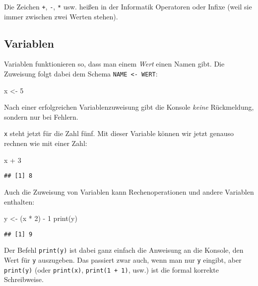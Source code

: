 \documentclass[11pt,german,a4paper]{article}
\newenvironment{Shaded}{\begin{snugshade}}{\end{snugshade}}
\newcommand{\DecValTok}[1]{\textcolor[rgb]{0.00,0.00,0.81}{#1}}
\newcommand{\FunctionTok}[1]{\textcolor[rgb]{0.00,0.00,0.00}{#1}}
\newcommand{\NormalTok}[1]{#1}
\newcommand{\OtherTok}[1]{\textcolor[rgb]{0.56,0.35,0.01}{#1}}
\newcommand{\SpecialCharTok}[1]{\textcolor[rgb]{0.00,0.00,0.00}{#1}}
\begin{document}
Die Zeichen \texttt{+}, \texttt{-}, \texttt{*} usw. heißen in der Informatik Operatoren oder Infixe (weil sie immer zwischen zwei Werten stehen).

\hypertarget{variablen}{%
\subsection{Variablen}\label{variablen}}

Variablen funktionieren so, dass man einem \emph{Wert} einen Namen gibt. Die Zuweisung folgt dabei dem Schema \texttt{NAME\ \textless{}-\ WERT}:

\begin{Shaded}
\begin{Highlighting}[]
\NormalTok{x }\OtherTok{\textless{}{-}} \DecValTok{5}
\end{Highlighting}
\end{Shaded}

Nach einer erfolgreichen Variablenzuweisung gibt die Konsole \emph{keine} Rückmeldung, sondern nur bei Fehlern.

\texttt{x} steht jetzt für die Zahl fünf. Mit dieser Variable können wir jetzt genauso rechnen wie mit einer Zahl:

\begin{Shaded}
\begin{Highlighting}[]
\NormalTok{x }\SpecialCharTok{+} \DecValTok{3}
\end{Highlighting}
\end{Shaded}

\begin{verbatim}
## [1] 8
\end{verbatim}

Auch die Zuweisung von Variablen kann Rechenoperationen und andere Variablen enthalten:

\begin{Shaded}
\begin{Highlighting}[]
\NormalTok{y }\OtherTok{\textless{}{-}}\NormalTok{ (x }\SpecialCharTok{*} \DecValTok{2}\NormalTok{) }\SpecialCharTok{{-}} \DecValTok{1}
\FunctionTok{print}\NormalTok{(y)}
\end{Highlighting}
\end{Shaded}

\begin{verbatim}
## [1] 9
\end{verbatim}

Der Befehl \texttt{print(y)} ist dabei ganz einfach die Anweisung an die Konsole, den Wert für \texttt{y} auszugeben. Das passiert zwar auch, wenn man nur \texttt{y} eingibt, aber \texttt{print(y)} (oder \texttt{print(x)}, \texttt{print(1\ +\ 1)}, usw.) ist die formal korrekte Schreibweise.
\end{document}
